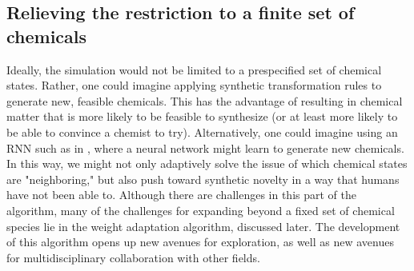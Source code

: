 \subsection{Relieving the restriction to a finite set of chemicals}
%
Ideally, the simulation would not be limited to a prespecified set of chemical states.
%
Rather, one could imagine applying synthetic transformation rules to generate new, feasible chemicals.
%
This has the advantage of resulting in chemical matter that is more likely to be feasible to synthesize (or at least more likely to be able to convince a chemist to try).
%
Alternatively, one could imagine using an RNN such as in \cite{Gupta2017}, where a neural network might learn to generate new chemicals.
%
In this way, we might not only adaptively solve the issue of which chemical states are "neighboring," but also push toward synthetic novelty in a way that humans have not been able to.
%
Although there are challenges in this part of the algorithm, many of the challenges for expanding beyond a fixed set of chemical species lie in the weight adaptation algorithm, discussed later.
%
The development of this algorithm opens up new avenues for exploration, as well as new avenues for multidisciplinary collaboration with other fields.